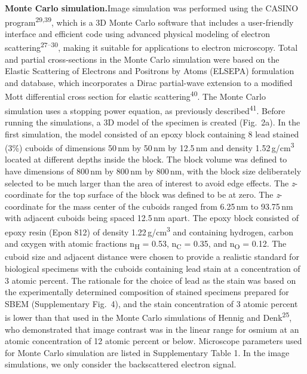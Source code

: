 \documentclass{article}
\newcommand{\cit}[1]{\textsuperscript{#1}}
\begin{document}
\medskip
\noindent\textbf{Monte Carlo simulation.}\quad Image simulation was performed using the CASINO program\cit{29,39}, which is a 3D Monte Carlo software that includes a user-friendly interface and efficient code using advanced physical modeling of electron scattering\cit{27–30}, making it suitable for applications to electron microscopy. Total and partial cross-sections in the Monte Carlo simulation were based on the Elastic Scattering of Electrons and Positrons by Atoms (ELSEPA) formulation and database, which incorporates a Dirac partial-wave extension to a modified Mott differential cross section for elastic scattering\cit{40}. The Monte Carlo simulation uses a stopping power equation, as previously described\cit{41}. Before running the simulations, a 3D model of the specimen is created (Fig.~2a). In the first simulation, the model consisted of an epoxy block containing 8 lead stained (3\%) cuboids of dimensions 50\,nm by 50\,nm by 12.5\,nm and density 1.52\,g/cm\textsuperscript{3} located at different depths inside the block. The block volume was defined to have dimensions of 800\,nm by 800\,nm by 800\,nm, with the block size deliberately selected to be much larger than the area of interest to avoid edge effects. The \emph{z}-coordinate for the top surface of the block was defined to be at zero. The \emph{z}-coordinate for the mass center of the cuboids ranged from 6.25\,nm to 93.75\,nm with adjacent cuboids being spaced 12.5\,nm apart. The epoxy block consisted of epoxy resin (Epon 812) of density 1.22\,g/cm\textsuperscript{3} and containing hydrogen, carbon and oxygen with atomic fractions n\textsubscript{H} = 0.53, n\textsubscript{C} = 0.35, and n\textsubscript{O} = 0.12. The cuboid size and adjacent distance were chosen to provide a realistic standard for biological specimens with the cuboids containing lead stain at a concentration of 3 atomic percent. The rationale for the choice of lead as the stain was based on the experimentally determined composition of stained specimens prepared for SBEM (Supplementary Fig.~4), and the stain concentration of 3 atomic percent is lower than that used in the Monte Carlo simulations of Hennig and Denk\cit{25}, who demonstrated that image contrast was in the linear range for osmium at an atomic concentration of 12 atomic percent or below. Microscope parameters used for Monte Carlo simulation are listed in Supplementary Table 1. In the image simulations, we only consider the backscattered electron signal.
\end{document}
